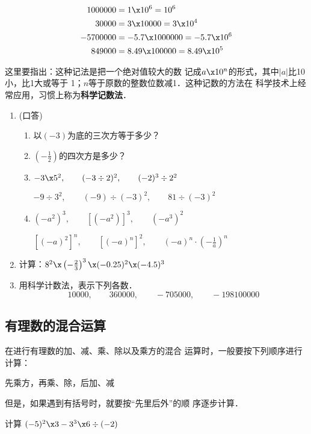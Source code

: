 \begin{solution}
	\[\begin{split}
	1000000 &=1\x 10^6=10^6\\ 
	30000  &=3\x 10000=3\x 10^4\\
	-5700000 &=-5.7\x 1000000=-5.7\x 10^6\\
	849000    &=8.49\x 100000=8.49\x 10^5
	\end{split}\]
\end{solution}

这里要指出：这种记法是把一个绝对值较大的数
记成$a\x10^n$的形式，其中$|a|$比10小，比1大或等于
1；$n$等于原数的整数位数减1．这种记数的方法在
科学技术上经常应用，习惯上称为\textbf{科学记数法}．


\begin{ex}
	\begin{enumerate}
		\item (口答)
		\begin{enumerate}
			\item 以$(- 3)$为底的三次方等于多少？
			\item $\left(-\frac{1}{2}\right)$的四次方是多少？
			\item $-3\x 5^2,\qquad (-3\div 2)^2,\qquad (-2)^3\div 2^2$
			
			$-9\div 3^2,\qquad (-9)\div (-3)^2,\qquad 81\div (-3)^2$
			\item $(-a^2)^3,\qquad [(-a^2)]^3,\qquad (-a^3)^2$
			
			$[(-a)^2]^n,\qquad [(-a)^n]^2,\qquad (-a)^n\cdot \left(-\frac{1}{a}\right)^n$
		\end{enumerate}   
		\item 计算：$8^2\x \left(-\frac{2}{3}\right)^3\x(-0.25)^2\x (-4.5)^3$
		\item 用科学计数法，表示下列各数．
		\[10000,\qquad 360000,\qquad -705000,\qquad -198100000  \]
	\end{enumerate}
\end{ex}

\subsection{有理数的混合运算}
在进行有理数的加、减、乘、除以及乘方的混合
运算时，一般要按下列顺序进行计算：
\begin{center}
	先乘方，再乘、除，后加、减  
\end{center}
但是，如果遇到有括号时，就要按“先里后外”的顺
序逐步计算．




\begin{example}
	计算 $(-5)^2\x 3-3^3\x 6\div (-2)$
\end{example}

